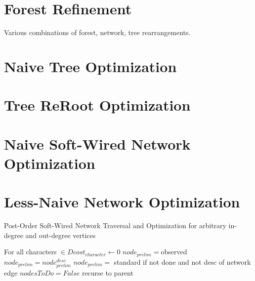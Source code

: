 \documentclass[11pt]{article}
\begin{document}
\section{Forest Refinement}\label{Forest Refinement}
Various combinations of forest, network, tree rearrangements.

 \section{Naive Tree Optimization}\label{Naive Tree Optimization}
 
 \section{Tree ReRoot Optimization}\label{Tree ReRoot Optimization}
 
 \section{Naive Soft-Wired Network Optimization}\label{Naive Soft-Wired Network Optimization}
 
 \section{Less-Naive Network Optimization} \label{Less-Naive Network Optimization}
 

	\begin{algorithm}
		\caption{Post-Order Soft-Wired Network Traversal and Optimization for arbitrary in-degree 
		and out-degree vertices}
		\label{alg:PON}
		\SetAlgoLined
		For all characters $\in D cost_{character} \gets 0$\;
		 {
			 {$node_{prelim} = $observed} 
			 {$node_{prelim} = node^{desc}_{prelim}$} 
			 {$node_{prelim} = $ standard if not done and not desc of network edge} 
			 {$nodesToDo = False$}
			 {recurse to parent}
		} 
	\end{algorithm}
	
\end{document}
